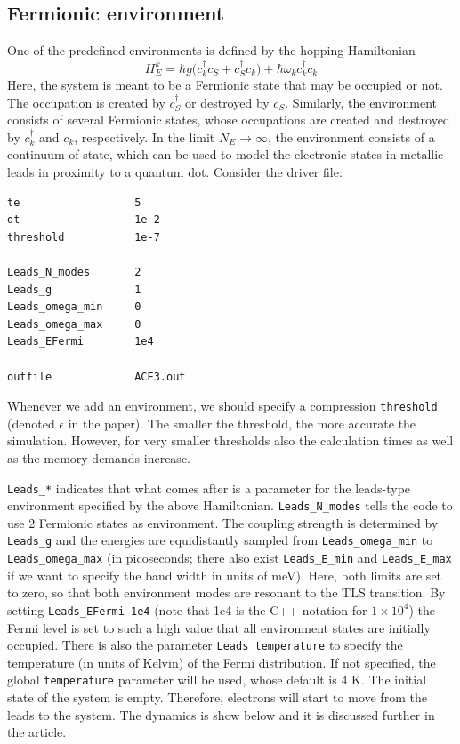 \documentclass{scrartcl}
\begin{document}
\subsection{Fermionic environment}
One of the predefined 
environments is defined by the hopping Hamiltonian
\begin{equation}
H_E^k=\hbar g \big( c^\dagger_k c_S + c^\dagger_S c_k ) 
+ \hbar\omega_k c^\dagger_k c_k
\end{equation}
Here, the system is meant to be a Fermionic state that may be occupied or not.
The occupation is created by $c^\dagger_S$ or destroyed by $c_S$. 
Similarly, the environment consists of several Fermionic states, whose 
occupations are created and destroyed by $c^\dagger_k$ and $c_k$, respectively.
In the limit $N_E\to \infty$, the environment consists of a continuum of state,
which can be used to model the electronic states in metallic leads in
proximity to a quantum dot.
Consider the driver file:

\noindent\makebox[5cm]{\rule{7cm}{0.4pt}}
\begin{verbatim}
te                  5
dt                  1e-2
threshold           1e-7

Leads_N_modes       2
Leads_g             1 
Leads_omega_min     0
Leads_omega_max     0
Leads_EFermi        1e4

outfile             ACE3.out
\end{verbatim}
\noindent\makebox[5cm]{\rule{7cm}{0.4pt}}

Whenever we add an environment, we should specify a compression 
\verb+threshold+ (denoted $\epsilon$ in the paper). The smaller the
threshold, the more accurate the simulation. 
However, for very smaller thresholds also the calculation times as well as
the memory demands increase.

\verb+Leads_*+ indicates that what comes after is a parameter for
the leads-type environment specified by the above Hamiltonian. 
\verb+Leads_N_modes+ tells the code to use 2 Fermionic states as environment.
The coupling strength is determined by \verb+Leads_g+ and the energies 
are equidistantly sampled from \verb+Leads_omega_min+ to \verb+Leads_omega_max+
(in picoseconds; there also exist \verb+Leads_E_min+ and \verb+Leads_E_max+ 
if we want to specify the band width in units of meV).
Here, both limits are set to zero, so that both environment modes are 
resonant to the TLS transition. By setting \verb+Leads_EFermi 1e4+ (note that
1e4 is the C++ notation for $1\times 10^4$) the Fermi level is set to such
a high value that all environment states are initially occupied. 
There is also the parameter \verb+Leads_temperature+ to specify the temperature
(in units of Kelvin) of the Fermi distribution. 
If not specified, the global \verb+temperature+ 
parameter will be used, whose default is 4 K.
The initial state of the system is empty. Therefore, electrons will 
start to move from the leads to the system.
The dynamics is show below and it is discussed further in the article.
\end{document}
